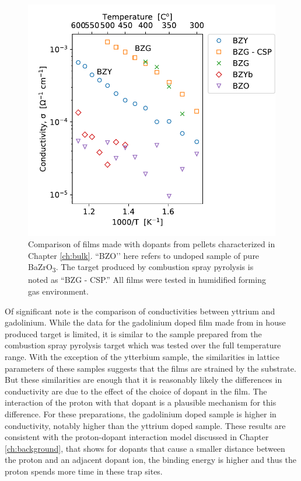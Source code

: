 \begin{figure}
    \centering
    \includegraphics{Figures/190619-eis-film-dopant-comparison-edit-3.pdf}
    \caption{Comparison of films made with dopants from pellets characterized in Chapter \ref{ch:bulk}. ``BZO’’ here refers to undoped sample of pure BaZrO\textsubscript{3}. The target produced by combustion spray pyrolysis is noted as ``BZG - CSP.'' All films were tested in humidified forming gas environment.}
    \label{fig:films:eis:dopantComparison}
\end{figure}

Of significant note is the comparison of conductivities between yttrium and gadolinium. While the data for the gadolinium doped film made from in house produced target is limited, it is similar to the sample prepared from the combustion spray pyrolysis target which was tested over the full temperature range. With the exception of the ytterbium sample, the similarities in lattice parameters of these samples suggests that the films are strained by the substrate. But these similarities are enough that it is reasonably likely the differences in conductivity are due to the effect of the choice of dopant in the film. The interaction of the proton with that dopant is a plausible mechanism for this difference. For these preparations, the gadolinium doped sample is higher in conductivity, notably higher than the yttrium doped sample. These results are consistent with the proton-dopant interaction model discussed in Chapter \ref{ch:background}, that shows for dopants that cause a smaller distance between the proton and an adjacent dopant ion, the binding energy is higher and thus the proton spends more time in these trap sites. 

